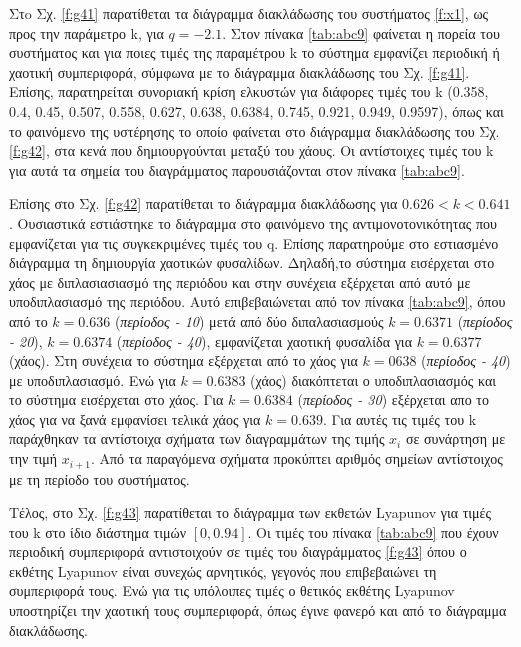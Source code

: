 Στo Σχ. \ref{f:g41} παρατίθεται τα διάγραμμα διακλάδωσης του συστήματος \ref{f:x1}, ως προς την παράμετρο k, για $q =- 2.1$. Στον πίνακα \ref{tab:abc9} φαίνεται η πορεία του συστήματος και για ποιες τιμές της παραμέτρου k το σύστημα εμφανίζει περιοδική ή χαοτική συμπεριφορά, σύμφωνα με το διάγραμμα διακλάδωσης του Σχ. \ref{f:g41}. Επίσης, παρατηρείται συνοριακή κρίση ελκυστών για διάφορες τιμές του k (0.358, 0.4, 0.45, 0.507, 0.558, 0.627, 0.638, 0.6384, 0.745, 0.921, 0.949, 0.9597), όπως και το φαινόμενο της υστέρησης το οποίο φαίνεται στο διάγραμμα διακλάδωσης του Σχ. \ref{f:g42}, στα κενά που δημιουργούνται μεταξύ του χάους. Οι αντίστοιχες τιμές του k για αυτά τα σημεία του διαγράμματος παρουσιάζονται στον πίνακα \ref{tab:abc9}.

Επίσης στο Σχ. \ref{f:g42} παρατίθεται το διάγραμμα διακλάδωσης για $0.626<k<0.641$. Ουσιαστικά εστιάστηκε το διάγραμμα στο φαινόμενο της αντιμονοτονικότητας που εμφανίζεται για τις συγκεκριμένες τιμές του q. Επίσης παρατηρούμε στο εστιασμένο διάγραμμα τη δημιουργία χαοτικών φυσαλίδων. Δηλαδή,το σύστημα εισέρχεται στο χάος με διπλασιασιασμό της περιόδου και στην συνέχεια εξέρχεται από αυτό με υποδιπλασιασμό της περιόδου. Αυτό επιβεβαιώνεται από τον πίνακα \ref{tab:abc9}, όπου από το $k=0.636$ (\emph{περίοδος - 10}) μετά από δύο διπαλασιασμούς $k=0.6371$ (\emph{περίοδος - 20}), $k=0.6374$ (\emph{περίοδος -  40}), εμφανίζεται χαοτική φυσαλίδα για $k=0.6377$ (χάος). Στη συνέχεια το σύστημα εξέρχεται από το χάος για $k=0638$ (\emph{περίοδος - 40}) με υποδιπλασιασμό. Ενώ για $k=0.6383$ (χάος) διακόπτεται ο  υποδιπλασιασμός και το σύστημα εισέρχεται στο χάος. Για $k=0.6384$ (\emph{περίοδος - 30}) εξέρχεται απο το χάος για να ξανά εμφανίσει τελικά χάος για $k=0.639$. Για αυτές τις τιμές του k παράχθηκαν τα αντίστοιχα σχήματα των διαγραμμάτων της τιμής \(x_i\) σε συνάρτηση με την τιμή \(x_{i+1}\). Από τα παραγόμενα σχήματα προκύπτει αριθμός σημείων αντίστοιχος με τη περίοδο του συστήματος.

Τέλος, στο Σχ. \ref{f:g43} παρατίθεται το διάγραμμα των εκθετών Lyapunov για τιμές του k στο ίδιο διάστημα τιμών $[0, 0.94]$. Οι τιμές του πίνακα \ref{tab:abc9} που έχουν περιοδική συμπεριφορά αντιστοιχούν σε τιμές του διαγράμματος \ref{f:g43} όπου ο εκθέτης Lyapunov είναι συνεχώς αρνητικός, γεγονός που επιβεβαιώνει τη συμπεριφορά τους. Ενώ για τις υπόλοιπες τιμές ο θετικός εκθέτης Lyapunov υποστηρίζει την χαοτική τους συμπεριφορά, όπως έγινε φανερό και από το διάγραμμα διακλάδωσης.\\\\



